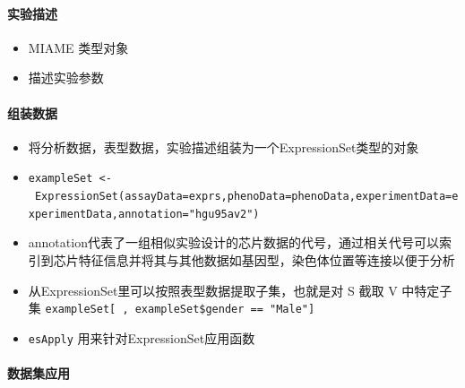 \documentclass[
]{book}
\providecommand{\tightlist}{%
  \setlength{\itemsep}{0pt}\setlength{\parskip}{0pt}}
\begin{document}
\hypertarget{ux5b9eux9a8cux63cfux8ff0}{%
\paragraph{实验描述}\label{ux5b9eux9a8cux63cfux8ff0}}

\begin{itemize}
\tightlist
\item
  MIAME 类型对象
\item
  描述实验参数
\end{itemize}

\hypertarget{ux7ec4ux88c5ux6570ux636e}{%
\paragraph{组装数据}\label{ux7ec4ux88c5ux6570ux636e}}

\begin{itemize}
\tightlist
\item
  将分析数据，表型数据，实验描述组装为一个ExpressionSet类型的对象
\item
  \texttt{exampleSet\ \textless{}-\ ExpressionSet(assayData=exprs,phenoData=phenoData,experimentData=experimentData,annotation="hgu95av2")}
\item
  annotation代表了一组相似实验设计的芯片数据的代号，通过相关代号可以索引到芯片特征信息并将其与其他数据如基因型，染色体位置等连接以便于分析
\item
  从ExpressionSet里可以按照表型数据提取子集，也就是对 S 截取 V 中特定子集 \texttt{exampleSet{[}\ ,\ exampleSet\$gender\ ==\ "Male"{]}}
\item
  \texttt{esApply} 用来针对ExpressionSet应用函数
\end{itemize}

\hypertarget{ux6570ux636eux96c6ux5e94ux7528}{%
\paragraph{数据集应用}\label{ux6570ux636eux96c6ux5e94ux7528}}
\end{document}
